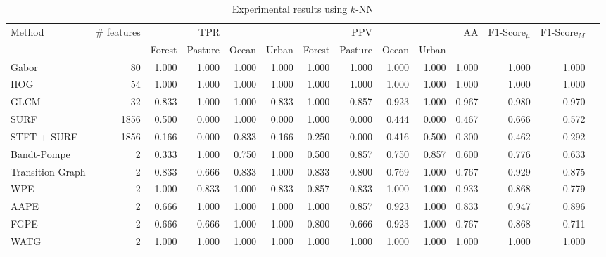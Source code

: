 \documentclass[journal]{IEEEtran}
\begin{document}
\begin{table}%
	\centering
	\caption{Experimental results using $k$-NN}
	\label{tab:result1}
	\begin{tabular}{lrrrr*9{r}}
		\toprule
		\multirow{2}{*}{Method} & \multirow{2}{*}{\# features} & & TPR & & & & PPV & & & \multirow{2}{*}{AA} & \multirow{2}{*}{$\text{F1-Score}_{\mu}$} & \multirow{2}{*}{$\text{F1-Score}_M$} \\ 
		\cmidrule(lr){3-6} 
		\cmidrule(lr){7-10}
		&   & Forest & Pasture & Ocean & Urban & Forest & Pasture & Ocean & Urban & &  \\ 
		\cmidrule(lr){1-1}
		\cmidrule(lr){2-2}
		\cmidrule(lr){3-6}
		\cmidrule(lr){7-10}
		\cmidrule(lr){11-11}
		\cmidrule(lr){12-12}
		\cmidrule(lr){13-13}
		Gabor & 80 & 
		1.000 & 1.000 & 1.000 & 1.000 & 
		1.000 & 1.000 & 1.000 & 1.000 & 
		1.000 & 1.000 & 1.000\\
		HOG & 54 & 
		1.000 & 1.000 & 1.000 & 1.000 & 
		1.000 & 1.000 & 1.000 & 1.000 & 
		1.000 & 1.000 & 1.000\\
		GLCM & 32 & 
		0.833 & 1.000 & 1.000 & 0.833 &
		1.000 & 0.857 & 0.923 & 1.000 &
		0.967 & 0.980 & 0.970\\
		SURF & 1856 & 
		0.500 & 0.000 & 1.000 & 0.000 & 
		1.000 & 0.000 & 0.444 & 0.000 &
		0.467 & 0.666 & 0.572\\
		STFT + SURF  & 1856 & 
		0.166 & 0.000 & 0.833 & 0.166 & 
		0.250 & 0.000 & 0.416 & 0.500 &
		0.300 & 0.462 & 0.292\\
		\cmidrule(lr){1-1}
		\cmidrule(lr){2-2}
		\cmidrule(lr){3-6}
		\cmidrule(lr){7-10}
		\cmidrule(lr){11-11}
		\cmidrule(lr){12-12}
		\cmidrule(lr){13-13}
		Bandt-Pompe & 2 & 
		0.333 & 1.000 & 0.750 & 1.000 &
		0.500 & 0.857 & 0.750 & 0.857 &
		0.600 & 0.776 & 0.633\\ 
		Transition Graph & 2 & 
		0.833 & 0.666 & 0.833 & 1.000 &
		0.833 & 0.800 & 0.769 & 1.000 &
		0.767 & 0.929 & 0.875\\
		\cmidrule(lr){1-1}
		\cmidrule(lr){2-2}
		\cmidrule(lr){3-6}
		\cmidrule(lr){7-10}
		\cmidrule(lr){11-11}
		\cmidrule(lr){12-12}
		\cmidrule(lr){13-13}
		WPE & 2 & 
		1.000 & 0.833 & 1.000 & 0.833 &
		0.857 & 0.833 & 1.000 & 1.000 &
		0.933 & 0.868 & 0.779\\ 
		AAPE & 2 & 
		0.666 & 1.000 & 1.000 & 1.000 &
		1.000 & 0.857 & 0.923 & 1.000 &
		0.833 & 0.947 & 0.896\\ 
		FGPE & 2 & 
		0.666 & 0.666 & 1.000 & 1.000 &
		0.800 & 0.666 & 0.923 & 1.000 &
		0.767 & 0.868 & 0.711\\ 
		\cmidrule(lr){1-1}
		\cmidrule(lr){2-2}
		\cmidrule(lr){3-6}
		\cmidrule(lr){7-10}
		\cmidrule(lr){11-11}
		\cmidrule(lr){12-12}
		\cmidrule(lr){13-13}
		WATG & 2 & 
		1.000 & 1.000 & 1.000 & 1.000 &
		1.000 & 1.000 & 1.000 & 1.000 &
		1.000 & 1.000 & 1.000\\
		\bottomrule
	\end{tabular}
\end{table}
\end{document}
